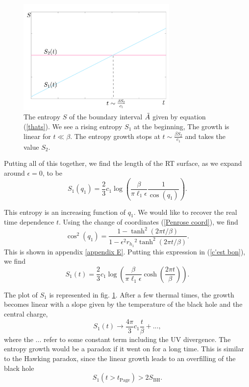 \begin{figure}
    \centering
    \includegraphics[width=0.7\textwidth]{figures/Real_time_Page.png}
    \caption{The entropy $S$ of the boundary interval $\Tilde{A}$ given by equation (\ref{thats}). We see a rising entropy $S_1$ at the beginning, The growth is linear for $t\ll \beta$. The entropy growth stops  at $t\sim\frac{\beta S_2}{c_1}$ and takes the value $S_2$.}
    \label{the final Page curve}
\end{figure}

Putting all of this together, we find the length of the RT surface, as we expand around $\epsilon=0$, to be
\begin{equation}\label{c'est bon}
    S_1(q_1) = \frac{2}{3}c_1\log\left(\frac{\beta}{\pi\ell_1\epsilon}\frac{1}{\cos(q_1)}\right).
\end{equation}

This entropy is an increasing function of $q_1$. We would like to recover the real time dependence $t$. Using the change of coordinates (\ref{Penrose coord}), we find
\begin{equation}
    \cos^2(q_1)=\frac{1-\tanh^2(2\pi t/\beta)}{1-\epsilon^2{r_h_1}^2\tanh^2(2\pi t/\beta)}.
\end{equation}
This is shown in appendix \ref{appendix E}.
Putting this expression in (\ref{c'est bon}), we find
\begin{equation}
    S_1(t) = \frac{2}{3}c_1\log\left(\frac{\beta}{\pi\ell_1\epsilon}\cosh\left(\frac{2\pi t}{\beta}\right)\right).
\end{equation}

The plot of $S_1$ is represented in fig. \ref{the final Page curve}. After a few thermal times, the growth becomes linear with a slope given by the temperature of the black hole and the central charge,
\begin{equation}
    S_1(t) \rightarrow \frac{4\pi}{3}c_1\frac{t}{\beta} + ...,
\end{equation}
where the $...$ refer to some constant term including the UV divergence. The entropy growth would be a paradox if it went on for a long time. This is similar to the Hawking paradox, since the linear growth leads to an overfilling of the black hole
\begin{equation}
    S_1\left(t>t_\text{Page}\right)>2S_\text{BH}.
\end{equation}

